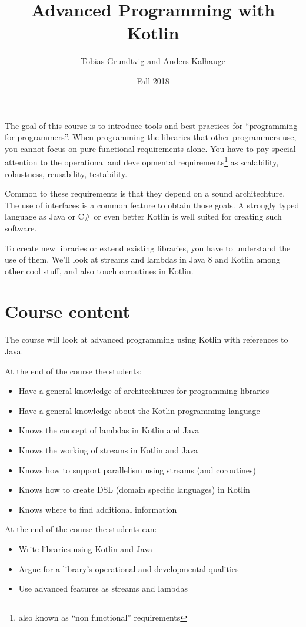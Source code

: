 \documentclass[12pt,a4paper,final]{article}
\title{Advanced Programming with Kotlin}
\author{Tobias Grundtvig and Anders Kalhauge}
\date{Fall 2018}
\begin{document}
\maketitle

The goal of this course is to introduce tools and best practices for ``programming for programmers''. When programming the libraries that other programmers use, you cannot focus on pure functional requirements alone. You have to pay special attention to the operational and developmental requirements\footnote{also known as ``non functional'' requirements} as scalability, robustness, reusability, testability.

Common to these requirements is that they depend on a sound architechture. The use of interfaces is a common feature to obtain those goals. A strongly typed language as Java or C\# or even better Kotlin is well suited for creating such software.

To create new libraries or extend existing libraries, you have to understand the use of them. We'll look at streams and lambdas in Java 8 and Kotlin among other cool stuff, and also touch coroutines in Kotlin.

\section*{Course content}

The course will look at advanced programming using Kotlin with references to Java.

At the end of the course the students:

\begin{itemize}
	\item Have a general knowledge of architechtures for programming libraries
	\item Have a general knowledge about the Kotlin programming language
	\item Knows the concept of lambdas in Kotlin and Java
	\item Knows the working of streams in Kotlin and Java
	\item Knows how to support parallelism using streams (and coroutines)
	\item Knows how to create DSL (domain specific languages) in Kotlin
  \item Knows where to find additional information
\end{itemize}

At the end of the course the students can:

\begin{itemize}
	\item Write libraries using Kotlin and Java
	\item Argue for a library's operational and developmental qualities
  \item Use advanced features as streams and lambdas
\end{itemize}
\end{document}
